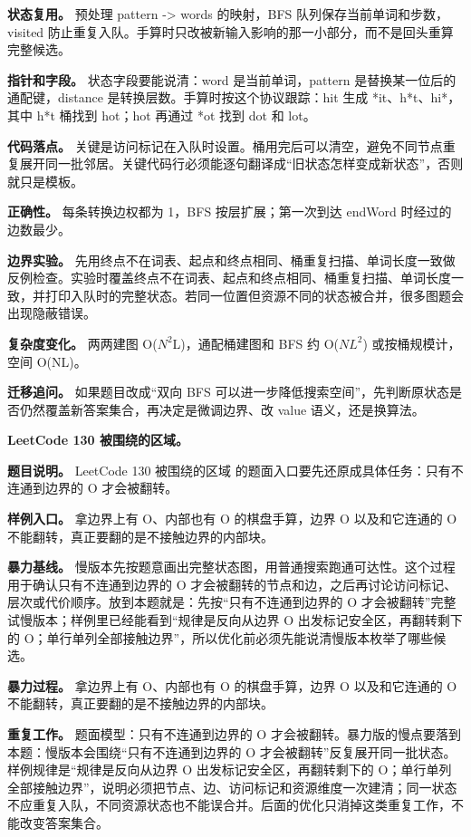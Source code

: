 \textbf{状态复用。} 预处理 pattern -> words 的映射，BFS 队列保存当前单词和步数，visited 防止重复入队。手算时只改被新输入影响的那一小部分，而不是回头重算完整候选。

\textbf{指针和字段。} 状态字段要能说清：word 是当前单词，pattern 是替换某一位后的通配键，distance 是转换层数。手算时按这个协议跟踪：hit 生成 *it、h*t、hi*，其中 h*t 桶找到 hot；hot 再通过 *ot 找到 dot 和 lot。

\textbf{代码落点。} 关键是访问标记在入队时设置。桶用完后可以清空，避免不同节点重复展开同一批邻居。关键代码行必须能逐句翻译成“旧状态怎样变成新状态”，否则就只是模板。

\textbf{正确性。} 每条转换边权都为 1，BFS 按层扩展；第一次到达 endWord 时经过的边数最少。

\textbf{边界实验。} 先用终点不在词表、起点和终点相同、桶重复扫描、单词长度一致做反例检查。实验时覆盖终点不在词表、起点和终点相同、桶重复扫描、单词长度一致，并打印入队时的完整状态。若同一位置但资源不同的状态被合并，很多图题会出现隐蔽错误。

\textbf{复杂度变化。} 两两建图 O(\ensuremath{N^{2}}L)，通配桶建图和 BFS 约 O(\ensuremath{NL^{2}}) 或按桶规模计，空间 O(NL)。

\textbf{迁移追问。} 如果题目改成“双向 BFS 可以进一步降低搜索空间”，先判断原状态是否仍然覆盖新答案集合，再决定是微调边界、改 value 语义，还是换算法。

\noindent\textbf{LeetCode 130 被围绕的区域。}

\textbf{题目说明。} LeetCode 130 被围绕的区域 的题面入口要先还原成具体任务：只有不连通到边界的 O 才会被翻转。

\textbf{样例入口。} 拿边界上有 O、内部也有 O 的棋盘手算，边界 O 以及和它连通的 O 不能翻转，真正要翻的是不接触边界的内部块。

\textbf{暴力基线。} 慢版本先按题意画出完整状态图，用普通搜索跑通可达性。这个过程用于确认只有不连通到边界的 O 才会被翻转的节点和边，之后再讨论访问标记、层次或代价顺序。放到本题就是：先按“只有不连通到边界的 O 才会被翻转”完整试慢版本；样例里已经能看到“规律是反向从边界 O 出发标记安全区，再翻转剩下的 O；单行单列全部接触边界”，所以优化前必须先能说清慢版本枚举了哪些候选。

\textbf{暴力过程。} 拿边界上有 O、内部也有 O 的棋盘手算，边界 O 以及和它连通的 O 不能翻转，真正要翻的是不接触边界的内部块。

\textbf{重复工作。} 题面模型：只有不连通到边界的 O 才会被翻转。暴力版的慢点要落到本题：慢版本会围绕“只有不连通到边界的 O 才会被翻转”反复展开同一批状态。样例规律是“规律是反向从边界 O 出发标记安全区，再翻转剩下的 O；单行单列全部接触边界”，说明必须把节点、边、访问标记和资源维度一次建清；同一状态不应重复入队，不同资源状态也不能误合并。后面的优化只消掉这类重复工作，不能改变答案集合。

